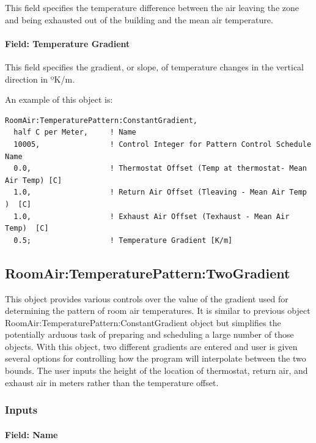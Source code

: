 This field specifies the temperature difference between the air leaving the zone and being exhausted out of the building and the mean air temperature.

\paragraph{Field: Temperature Gradient}\label{field-temperature-gradient}

This field specifies the gradient, or slope, of temperature changes in the vertical direction in ºK/m.

An example of this object is:

\begin{lstlisting}
RoomAir:TemperaturePattern:ConstantGradient,
  half C per Meter,     ! Name
  10005,                ! Control Integer for Pattern Control Schedule Name
  0.0,                  ! Thermostat Offset (Temp at thermostat- Mean Air Temp) [C]
  1.0,                  ! Return Air Offset (Tleaving - Mean Air Temp )  [C]
  1.0,                  ! Exhaust Air Offset (Texhaust - Mean Air Temp)  [C]
  0.5;                  ! Temperature Gradient [K/m]
\end{lstlisting}

\subsection{RoomAir:TemperaturePattern:TwoGradient}\label{roomairtemperaturepatterntwogradient}

This object provides various controls over the value of the gradient used for determining the pattern of room air temperatures. It is similar to previous object RoomAir:TemperaturePattern:ConstantGradient object but simplifies the potentially arduous task of preparing and scheduling a large number of those objects. With this object, two different gradients are entered and user is given several options for controlling how the program will interpolate between the two bounds. The user inputs the height of the location of thermostat, return air, and exhaust air in meters rather than the temperature offset.

\subsubsection{Inputs}\label{inputs-3-031}

\paragraph{Field: Name}\label{field-name-3-027}


